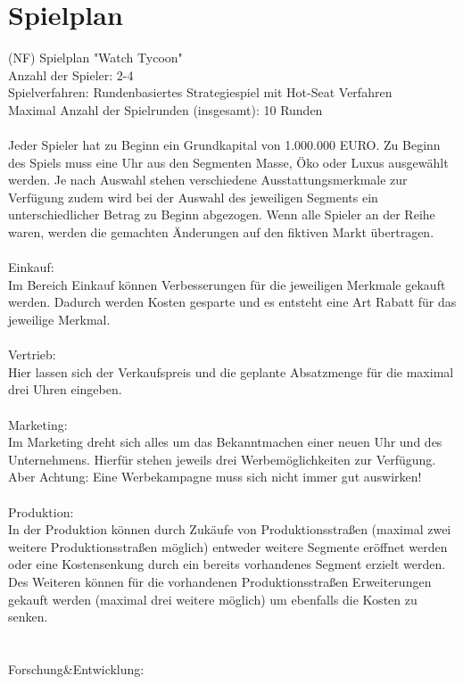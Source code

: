 \clearpage
\chapter{Spielplan}
(NF) Spielplan "Watch Tycoon" \\
Anzahl der Spieler: 2-4 \\
Spielverfahren: Rundenbasiertes Strategiespiel mit Hot-Seat Verfahren \\
Maximal Anzahl der Spielrunden (insgesamt): 10 Runden \\
\\
Jeder Spieler hat zu Beginn ein Grundkapital von 1.000.000 EURO. Zu Beginn des Spiels muss eine Uhr aus den Segmenten Masse, Öko oder Luxus ausgewählt werden. Je nach Auswahl stehen verschiedene Ausstattungsmerkmale zur Verfügung zudem wird bei der Auswahl des jeweiligen Segments ein unterschiedlicher Betrag zu Beginn abgezogen. Wenn alle Spieler an der Reihe waren, werden die gemachten Änderungen auf den fiktiven Markt übertragen. \\ 
\\
Einkauf:\\
Im Bereich Einkauf können Verbesserungen für die jeweiligen Merkmale gekauft werden. Dadurch werden Kosten gesparte und es entsteht eine Art Rabatt für das jeweilige Merkmal. \\
\\
Vertrieb: \\
Hier lassen sich der Verkaufspreis und die geplante Absatzmenge für die maximal drei Uhren eingeben.\\
\\
Marketing:\\
Im Marketing dreht sich alles um das Bekanntmachen einer neuen Uhr und des Unternehmens. Hierfür stehen jeweils drei Werbemöglichkeiten zur Verfügung. Aber Achtung: Eine Werbekampagne muss sich nicht immer gut auswirken!\\ 
\\
Produktion: \\
In der Produktion können durch Zukäufe von Produktionsstraßen (maximal zwei weitere Produktionsstraßen möglich) entweder weitere Segmente eröffnet werden oder eine Kostensenkung durch ein bereits vorhandenes Segment erzielt werden. Des Weiteren können für die vorhandenen Produktionsstraßen Erweiterungen gekauft werden (maximal drei weitere möglich) um ebenfalls die Kosten zu senken. \\ 
\\
\\
Forschung\&Entwicklung:\\
